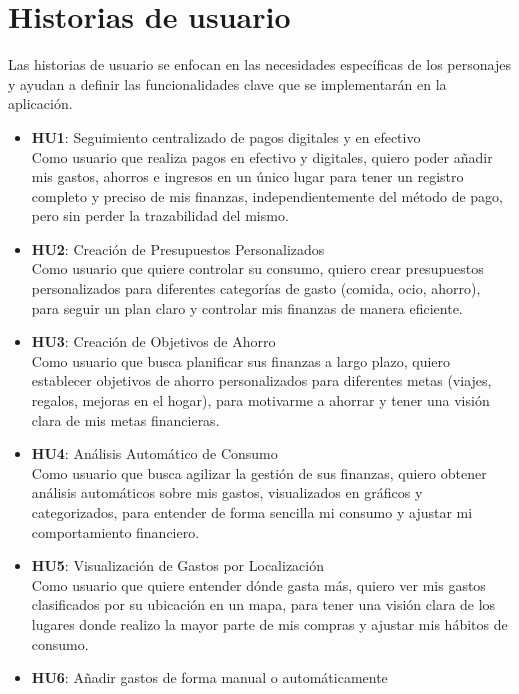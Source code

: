 \section{Historias de usuario}
Las historias de usuario se enfocan en las necesidades específicas de los personajes y ayudan a definir las funcionalidades clave que se implementarán en la aplicación.

\begin{itemize}
    \item \textbf{HU1}: Seguimiento centralizado de pagos digitales y en efectivo\\
    Como usuario que realiza pagos en efectivo y digitales,
    quiero poder añadir mis gastos, ahorros e ingresos en un único lugar
    para tener un registro completo y preciso de mis finanzas, independientemente del método de pago, pero sin perder la trazabilidad del mismo.
    \item \textbf{HU2}: Creación de Presupuestos Personalizados\\
    Como usuario que quiere controlar su consumo,
    quiero crear presupuestos personalizados para diferentes categorías de gasto (comida, ocio, ahorro), para seguir un plan claro y controlar mis finanzas de manera eficiente.
    \item \textbf{HU3}: Creación de Objetivos de Ahorro\\
    Como usuario que busca planificar sus finanzas a largo plazo,
    quiero establecer objetivos de ahorro personalizados para diferentes metas (viajes, regalos, mejoras en el hogar),
    para motivarme a ahorrar y tener una visión clara de mis metas financieras.
    \item \textbf{HU4}: Análisis Automático de Consumo\\
    Como usuario que busca agilizar la gestión de sus finanzas,
    quiero obtener análisis automáticos sobre mis gastos, visualizados en gráficos y categorizados, para entender de forma sencilla mi consumo y ajustar mi comportamiento financiero.
    \item \textbf{HU5}: Visualización de Gastos por Localización\\
    Como usuario que quiere entender dónde gasta más,
    quiero ver mis gastos clasificados por su ubicación en un mapa,
    para tener una visión clara de los lugares donde realizo la mayor parte de mis compras y ajustar mis hábitos de consumo.
    \item \textbf{HU6}: Añadir gastos de forma manual o automáticamente\\ 

\end{itemize}
